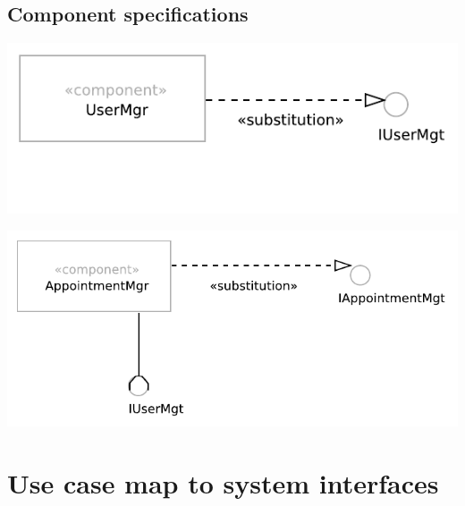 \documentclass[a4paper]{scrartcl}
\begin{document}
\subsection{Component specifications}

\includegraphics{pictures/UserMgr}

\includegraphics{pictures/AppointmentMgr}

\section{Use case map to system interfaces}
\end{document}
